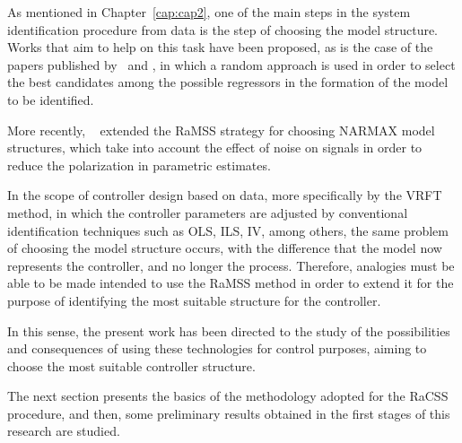 As mentioned in Chapter~\ref{cap:cap2}, one of the main steps in the system identification procedure from data is the step of choosing the model structure. Works that aim to help on this task have been proposed, as is the case of the papers published  by~\cite{baldacchino2012,baldacchino2013} and \cite{falsone2014,falsone2015},
in which a random approach is used in order to select the best candidates among the possible regressors in the formation of the model to be identified.

%
More recently, ~\cite{retesNARMAXModelIdentification2019} extended the RaMSS strategy for choosing NARMAX model structures, which take into account the effect of noise on signals in order to reduce the polarization in parametric estimates.

In the scope of controller design based on data, more specifically by the VRFT method, in which the controller parameters are adjusted by conventional identification techniques such as OLS, ILS, IV, among others, the same problem of choosing the model structure occurs, with the difference that the model now represents the controller, and no longer the process. Therefore, analogies must be able to be made intended to use the RaMSS method in order to extend it for the purpose of identifying the most suitable structure for the controller.

In this sense, the present work has been directed to the study of the possibilities and consequences of using these technologies for control purposes, aiming to choose the most suitable controller structure.

The next section presents the basics of the methodology adopted for the RaCSS procedure, and then, some preliminary results obtained in the first stages of this research are studied.




